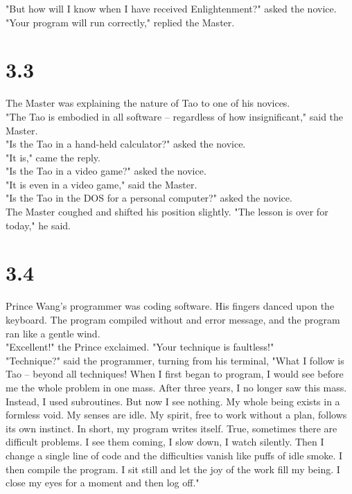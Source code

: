 \documentclass[14pt, letterpaper]{book}
\begin{document}
"But how will I know when I have received Enlightenment?" asked the novice.\\

"Your program will run correctly," replied the Master.\\

\section*{3.3}
The Master was explaining the nature of Tao to one of his novices.\\

"The Tao is embodied in all software -- regardless of how insignificant," said the Master.\\

"Is the Tao in a hand-held calculator?" asked the novice.\\

"It is," came the reply.\\

"Is the Tao in a video game?" asked the novice.\\

"It is even in a video game," said the Master.\\

"Is the Tao in the DOS for a personal computer?" asked the novice.\\

The Master coughed and shifted his position slightly. "The lesson is over for today," he said.\\

\section*{3.4}
Prince Wang's programmer was coding software. His fingers danced upon the keyboard. The program compiled without and error message, and the program ran like a gentle wind.\\

"Excellent!" the Prince exclaimed. "Your technique is faultless!"\\

"Technique?" said the programmer, turning from his terminal, "What I follow is Tao -- beyond all techniques! When I first began to program, I would see before me the whole problem in one mass. After three years, I no longer saw this mass. Instead, I used subroutines. But now I see nothing. My whole being exists in a formless void. My senses are idle. My spirit, free to work without a plan, follows its own instinct. In short, my program writes itself. True, sometimes there are difficult problems. I see them coming, I slow down, I watch silently. Then I change a single line of code and the difficulties vanish like puffs of idle smoke. I then compile the program. I sit still and let the joy of the work fill my being. I close my eyes for a moment and then log off."\\
\end{document}
